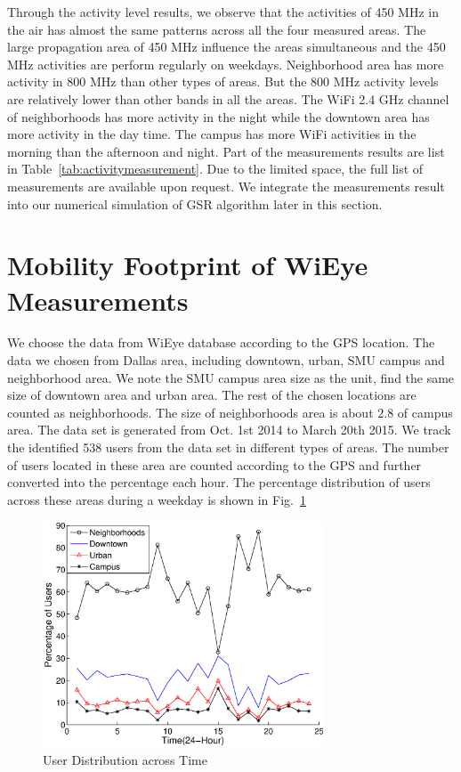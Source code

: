 Through the activity level results, we observe that the activities of 450 MHz in the air has almost the same patterns across all 
the four measured areas. The large propagation area of 450 MHz influence the areas simultaneous and the 450 MHz activities are 
perform regularly on weekdays.
Neighborhood area has more activity in 800 MHz than other types of areas. But the 800 MHz activity levels are relatively lower than 
other bands in all the areas.
The WiFi 2.4 GHz channel of neighborhoods has more activity in the night while the downtown area has more activity in the day time.
The campus has more WiFi activities in the morning than the afternoon and night. 
Part of the measurements results are list in Table~\ref{tab:activitymeasurement}.
Due to the limited space, the full list of measurements are available upon request.
We integrate the measurements result into our numerical simulation of GSR algorithm later in this section.






\section{Mobility Footprint of WiEye Measurements}

We choose the data from WiEye database according to the GPS location. The data we chosen from
Dallas area, including downtown, urban, SMU campus and neighborhood area. We note the SMU campus 
area size as the unit, find the same size of downtown area and urban area. The rest of the chosen 
locations are counted as neighborhoods. The size of neighborhoods area is about $2.8$ of campus 
area. The data set is generated from Oct. 1st 2014 to March 20th 2015. 
We track the identified 538 users from the data set in different types of areas. 
The number of users located in these area are counted according to the GPS and further converted into 
the percentage each hour. The percentage distribution of users across these areas during a weekday is shown 
in Fig.~\ref{fig:wieyeprocess}

\begin{figure}
\vspace{-0.0in}
\centering
\includegraphics[width=84mm]{figures/wieyeprocess}
\vspace{-0.1in}
\caption{User Distribution across Time}
\label{fig:wieyeprocess}
\vspace{-0.1in}
\end{figure}

